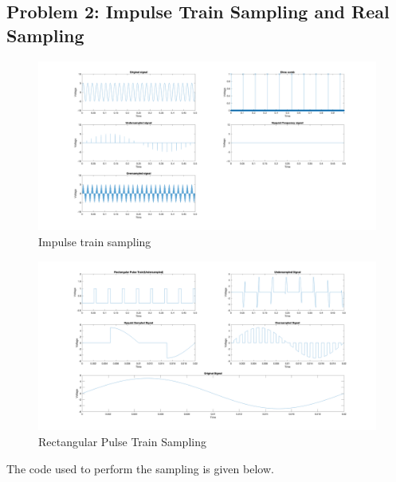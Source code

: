 \subsection{Problem 2: Impulse Train Sampling and Real Sampling}

\begin{figure}[H]
      \centering
      \includegraphics[width=\textwidth]{images/lab_4/problem2_part1.png}
      \caption{Impulse train sampling}
      \label{fig:impulse_train_sampling}
\end{figure}

\begin{figure}[H]
      \centering
      \includegraphics[width=\textwidth]{images/lab_4/problem2_part2.png}
      \caption{Rectangular Pulse Train Sampling}
\end{figure}

The code used to perform the sampling is given below.


